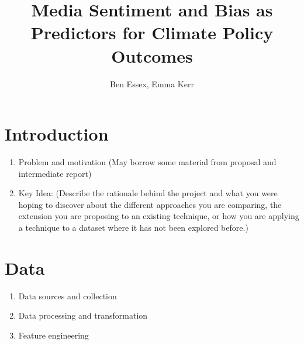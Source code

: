 \documentclass[11pt]{article}
\title{Media Sentiment and Bias as\\ 
\vspace{.1in} 
Predictors for Climate Policy Outcomes}
\author{Ben Essex, Emma Kerr}
\date{}
\begin{document}
\maketitle


\section{Introduction}

\vspace{.1in}

\begin{enumerate}
    \item Problem and motivation (May borrow some material from proposal and intermediate report)
    \item Key Idea: (Describe the rationale behind the project and what you were hoping to discover about the different approaches you are comparing, the extension you are proposing to an existing technique, or how you are applying a technique to a dataset where it has not been explored before.)
\end{enumerate}


\section{Data}

\vspace{.1in}

\begin{enumerate}
    \item Data sources and collection
    \item Data processing and transformation
    \item Feature engineering
\end{enumerate}

\end{document}

